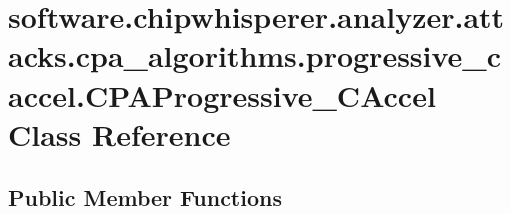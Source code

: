 \hypertarget{classsoftware_1_1chipwhisperer_1_1analyzer_1_1attacks_1_1cpa__algorithms_1_1progressive__caccel_1_1CPAProgressive__CAccel}{}\section{software.\+chipwhisperer.\+analyzer.\+attacks.\+cpa\+\_\+algorithms.\+progressive\+\_\+caccel.\+C\+P\+A\+Progressive\+\_\+\+C\+Accel Class Reference}
\label{classsoftware_1_1chipwhisperer_1_1analyzer_1_1attacks_1_1cpa__algorithms_1_1progressive__caccel_1_1CPAProgressive__CAccel}
\subsection*{Public Member Functions}
